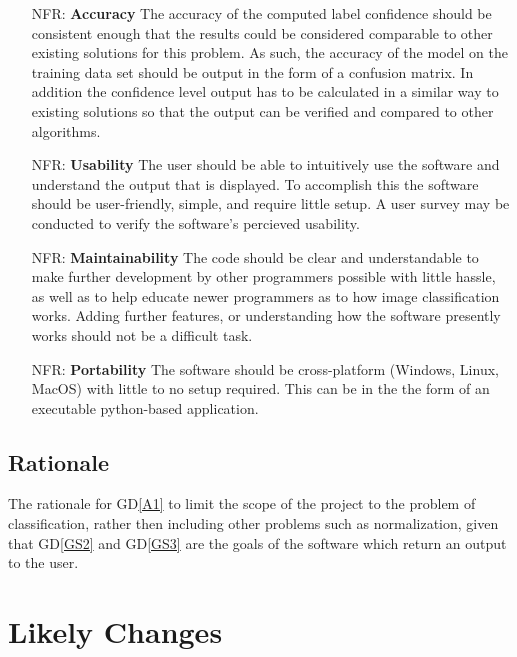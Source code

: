 \documentclass[12pt]{article}
\newcommand{\dref}[1]{GD\ref{#1}}
\newcounter{nfrnum} %
\begin{document}
\noindent \begin{itemize}

\item[NFR\refstepcounter{nfrnum}\thenfrnum \label{NFR1}:]
  \textbf{Accuracy} The accuracy of the computed label confidence should be consistent enough that the results 
  could be considered comparable to other existing solutions for this problem. As such, the accuracy of the model
  on the training data set should be output in the form of a confusion matrix. In addition the confidence level output has to
  be calculated in a similar way to existing solutions so that the output can be verified and compared to other algorithms.

\item[NFR\refstepcounter{nfrnum}\thenfrnum \label{NFR2}:] \textbf{Usability}
  The user should be able to intuitively use the software and understand the output that is displayed.
  To accomplish this the software should be user-friendly, simple, and require little setup. A user survey
  may be conducted to verify the software's percieved usability.

\item[NFR\refstepcounter{nfrnum}\thenfrnum \label{NFR3}:]
  \textbf{Maintainability} The code should be clear and understandable to make further development by other programmers 
  possible with little hassle, as well as to help educate newer programmers as to how image classification works.
  Adding further features, or understanding how the software presently works should not be a difficult task.


\item[NFR\refstepcounter{nfrnum}\thenfrnum \label{NFR4}:]
  \textbf{Portability} The software should be cross-platform (Windows, Linux, MacOS) with little to no setup
  required. This can be in the the form of an executable python-based application.

\end{itemize}

\subsection{Rationale}

The rationale for \dref{A1} to limit the scope of the project to the problem of classification, rather then including
other problems such as normalization, given that \dref{GS2} and \dref{GS3} are the goals of the software which return an output
to the user.

\section{Likely Changes}
\end{document}
